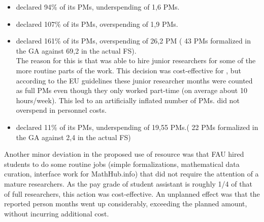 \begin{itemize}
\item {} declared 94\% of its PMs, underspending of 1,6 PMs.
\item {} declared 107\% of its PMs, overspending of 1,9 PMs.
\item {} declared 161\% of its PMs, overspending of 26,2 PM ( 43 PMs
formalized in the GA against 69,2 in the actual FS).\\
The reason for this is that  was able to hire junior researchers for some of the more routine parts of the work.
This decision was cost-effective for \pn, but according to the EU guidelines these junior researcher months were counted as full PMs even though they only worked part-time (on average about 10 hours/week).
This led to an artificially inflated number of PMs.  did not overspend in personnel costs.
\item {} declared 11\% of its PMs, underspending of 19,55 PMs.( 22 PMs
formalized in the GA against 2,4 in the actual FS)

\end{itemize}




Another minor deviation in the proposed use of resource was that FAU hired students to do
some routine jobs (simple formalizations, mathematical data curation, interface work for
MathHub.info) that did not require the attention of a mature researchers. As the pay grade
of student assistant is roughly 1/4 of that of full researchers, this action was
cost-effective. An unplanned effect was that the reported person months went up
considerably, exceeding the planned amount, without incurring additional cost.

